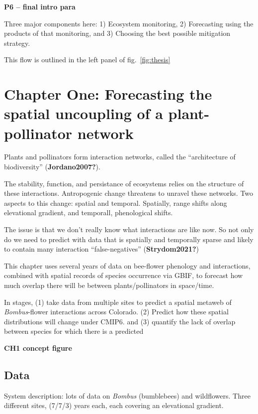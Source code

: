 \documentclass[10pt,oneside]{article}
\begin{document}
\textbf{P6 -- final intro para}

Three major components here: 1) Ecosystem monitoring, 2) Forecasting
using the products of that monitoring, and 3) Choosing the best possible
mitigation strategy.

This flow is outlined in the left panel of fig.~\ref{fig:thesis}

\hypertarget{chapter-one-forecasting-the-spatial-uncoupling-of-a-plant-pollinator-network}{%
\section{Chapter One: Forecasting the spatial uncoupling of a
plant-pollinator
network}\label{chapter-one-forecasting-the-spatial-uncoupling-of-a-plant-pollinator-network}}

Plants and pollinators form interaction networks, called the
``architecture of biodiversity'' (\textbf{Jordano2007?}).

The stability, function, and persistance of ecosystems relies on the
structure of these interactions. Antropogenic change threatens to
unravel these networks. Two aspects to this change: spatial and
temporal. Spatially, range shifts along elevational gradient, and
temporall, phenological shifts.

The issue is that we don't really know what interactions are like now.
So not only do we need to predict with data that is spatially and
temporally sparse and likely to contain many interaction
``false-negatives'' (\textbf{Strydom2021?})

This chapter uses several years of data on bee-flower phenology and
interactions, combined with spatial records of species occurrence via
GBIF, to forecast how much overlap there will be between
plants/pollinators in space/time.

In stages, (1) take data from multiple sites to predict a spatial
metaweb of \emph{Bombus}-flower interactions across Colorado. (2)
Predict how these spatial distributions will change under CMIP6. and (3)
quantify the lack of overlap between species for which there is a
predicted

\textbf{CH1 concept figure}

\hypertarget{data}{%
\subsection{Data}\label{data}}

System description: lots of data on \emph{Bombus} (bumblebees) and
wildflowers. Three different sites, (7/7/3) years each, each covering an
elevational gradient.
\end{document}

